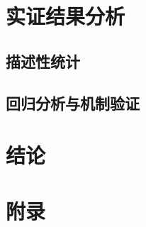 \documentclass[a4paper,11pt, fontset=fandol]{ctexart}
\begin{document}
\newpage

\section{实证结果分析}

\subsection{描述性统计}

\subsection{回归分析与机制验证}


\newpage

\section{结论}

\newpage

\section*{附录}


\newpage
\end{document}
